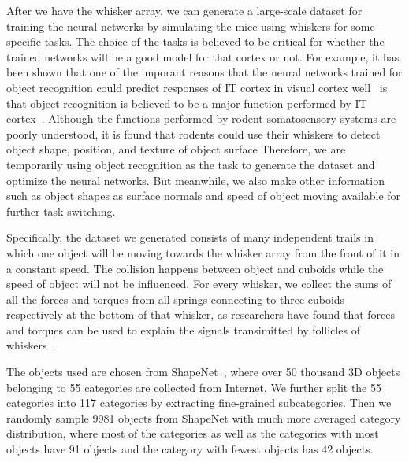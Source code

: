 After we have the whisker array, we can generate a large-scale dataset for training the neural networks by simulating the mice using whiskers for some specific tasks.
The choice of the tasks is believed to be critical for whether the trained networks will be a good model for that cortex or not.
For example, it has been shown that one of the imporant reasons that the neural networks trained for object recognition could predict responses of IT cortex in visual cortex well~\cite{cadieu2014deep, Yamins2014} is that object recognition is believed to be a major function performed by IT cortex~\cite{hung2005fast, yamins2016using}.
Although the functions performed by rodent somatosensory systems are poorly understood, it is found that rodents could use their whiskers to detect object shape, position, and texture of object surface\cite{Boubenec2012,Diamond2008,Arabzadeh2005,OConnor2010}
Therefore, we are temporarily using object recognition as the task to generate the dataset and optimize the neural networks.
But meanwhile, we also make other information such as object shapes as surface normals and speed of object moving available for further task switching.

Specifically, the dataset we generated consists of many independent trails in which one object will be moving towards the whisker array from the front of it in a constant speed.
The collision happens between object and cuboids while the speed of object will not be influenced.
For every whisker, we collect the sums of all the forces and torques from all springs connecting to three cuboids respectively at the bottom of that whisker, as researchers have found that forces and torques can be used to explain the signals transimitted by follicles of whiskers~\cite{Quist2014, Huet2016}.

The objects used are chosen from ShapeNet~\cite{Chang2015}, where over 50 thousand 3D objects belonging to 55 categories are collected from Internet.
We further split the 55 categories into 117 categories by extracting fine-grained subcategories.
Then we randomly sample 9981 objects from ShapeNet with much more averaged category distribution, where most of the categories as well as the categories with most objects have 91 objects and the category with fewest objects has 42 objects.

